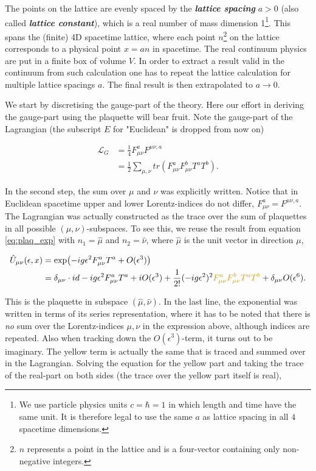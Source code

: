 \documentclass{article}
\theoremstyle{plain} %
\theoremstyle{convention} %
\theoremstyle{remark} %
\def\df#1{\textbf{\textit{#1}}}
\numberwithin{equation}{section}
\begin{document}
The points on the lattice are evenly spaced by the \df{lattice spacing} $a > 0$ (also called \df{lattice constant}), which is a real number of mass dimension 1\footnote{We use particle physics units $c = \hbar = 1$ in which length and time have the same unit. It is therefore legal to use the same $a$ as lattice spacing in all $4$ spacetime dimensions.}. This spans the (finite) 4D spacetime lattice, where each point $n$\footnote{$n$ represents a point in the lattice and is a four-vector containing only non-negative integers.} on the lattice corresponds to a physical point $x = an$ in spacetime. The real continuum physics are put in a finite box of volume $V$. In order to extract a result valid in the continuum from such calculation one has to repeat the lattice calculation for multiple lattice spacings $a$. The final result is then extrapolated to $a \to 0$.

We start by discretising the gauge-part of the theory. Here our effort in deriving the gauge-part using the plaquette will bear fruit. Note the gauge-part of the Lagrangian (the subscript $E$ for "Euclidean" is dropped from now on)

\begin{align*}
    \mathcal{L}_G &= \frac{1}{4} F_{\mu \nu}^a F^{\mu \nu, a} \\
    &= \frac{1}{2} \sum_{\mu, \nu} tr( F_{\mu \nu}^a F_{\mu \nu}^b T^a T^b).
\end{align*}

In the second step, the sum over $\mu$ and $\nu$ was explicitly written. Notice that in Euclidean spacetime upper and lower Lorentz-indices do not differ, $F_{\mu \nu}^a = F^{\mu \nu, a}$. The Lagrangian was actually constructed as the trace over the sum of plaquettes in all possible $(\mu, \nu)$-subspaces. To see this, we reuse the result from equation \eqref{eq:plaq_exp} with $n_1 = \hat{\mu}$ and $n_2 = \hat{\nu}$, where $\hat{\mu}$ is the unit vector in direction $\mu$,

\begin{align*}
    \hat{U}_{\mu \nu}(\epsilon,x) &= \exp(-ig \epsilon^2 F_{\mu \nu}^a T^a + O(\epsilon^3) ) \\
    &= \delta_{\mu \nu} \cdot id -ig \epsilon^2 F_{\mu \nu}^a T^a + i O(\epsilon^3) + \frac{1}{2!}(-ig \epsilon^2)^2 \textcolor{cyellow}{F_{\mu \nu}^a F_{\mu \nu}^b T^a T^b } + \delta_{\mu \nu} O(\epsilon^6).
\end{align*}

This is the plaquette in subspace $(\hat{\mu}, \hat{\nu})$. In the last line, the exponential was written in terms of its series representation, where it has to be noted that there is \textit{no} sum over the Lorentz-indices $\mu,\nu$ in the expression above, although indices are repeated. Also when tracking down the $O(\epsilon^3)$-term, it turns out to be imaginary. The \textcolor{cyellow}{yellow} term is actually the same that is traced and summed over in the Lagrangian. Solving the equation for the yellow part and taking the trace of the real-part on both sides (the trace over the yellow part itself is real),
\end{document}
